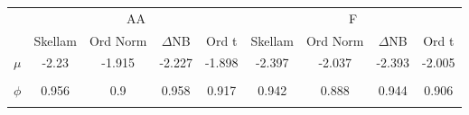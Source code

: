 \begin{footnotesize}
\tabcolsep=0.07cm
\begin{singlespace}
\begin{tabular}{ccccccccc} \toprule 
 & \multicolumn{4}{c}{AA}& \multicolumn{4}{c}{F} \\ 
\cmidrule(r){2-5} \cmidrule(r){6-9} &  \multicolumn{1}{c}{Skellam}&  \multicolumn{1}{c}{Ord Norm}&  \multicolumn{1}{c}{$\Delta$NB}&  \multicolumn{1}{c}{Ord t}&  \multicolumn{1}{c}{Skellam}&  \multicolumn{1}{c}{Ord Norm}&  \multicolumn{1}{c}{$\Delta$NB}&  \multicolumn{1}{c}{Ord t} \\ \midrule 
$ \mu $ & -2.23 & -1.915 & -2.227 & -1.898 & -2.397 & -2.037 & -2.393 & -2.005 \\ 
 & \begin{tiny} [-2.29,-2.17] \end{tiny}  & \begin{tiny} [-1.96,-1.869] \end{tiny}  & \begin{tiny} [-2.288,-2.167] \end{tiny}  & \begin{tiny} [-1.943,-1.854] \end{tiny}  & \begin{tiny} [-2.442,-2.351] \end{tiny}  & \begin{tiny} [-2.07,-2.005] \end{tiny}  & \begin{tiny} [-2.436,-2.348] \end{tiny}  & \begin{tiny} [-2.036,-1.973] \end{tiny}  \\ 
$ \phi $ & 0.956 & 0.9 & 0.958 & 0.917 & 0.942 & 0.888 & 0.944 & 0.906 \\ 
 & \begin{tiny} [0.944,0.968] \end{tiny}  & \begin{tiny} [0.881,0.921] \end{tiny}  & \begin{tiny} [0.947,0.971] \end{tiny}  & \begin{tiny} [0.898,0.933] \end{tiny}  & \begin{tiny} [0.933,0.951] \end{tiny}  & \begin{tiny} [0.876,0.901] \end{tiny}  & \begin{tiny} [0.936,0.953] \end{tiny}  & \begin{tiny} [0.894,0.918] \end{tiny}  \\ 

\end{tabular}
\end{singlespace}
\end{footnotesize}
